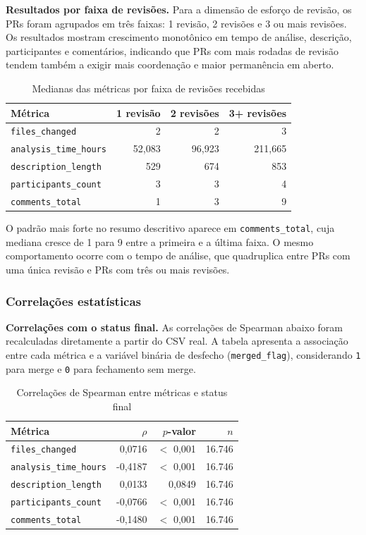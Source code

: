 \documentclass[12pt,a4paper]{article}
\begin{document}
\textbf{Resultados por faixa de revis\~oes.} Para a dimens\~ao de esfor\c{c}o de revis\~ao, os PRs foram agrupados em tr\^es faixas: 1 revis\~ao, 2 revis\~oes e 3 ou mais revis\~oes. Os resultados mostram crescimento monot\^onico em tempo de an\'alise, descri\c{c}\~ao, participantes e coment\'arios, indicando que PRs com mais rodadas de revis\~ao tendem tamb\'em a exigir mais coordena\c{c}\~ao e maior perman\^encia em aberto.

\begin{table}[H]
\centering
\caption{Medianas das m\'etricas por faixa de revis\~oes recebidas}
\begin{tabular}{@{}lrrr@{}}
\toprule
M\'etrica & 1 revis\~ao & 2 revis\~oes & 3+ revis\~oes \\ \midrule
\texttt{files\_changed} & 2 & 2 & 3 \\
\texttt{analysis\_time\_hours} & 52,083 & 96,923 & 211,665 \\
\texttt{description\_length} & 529 & 674 & 853 \\
\texttt{participants\_count} & 3 & 3 & 4 \\
\texttt{comments\_total} & 1 & 3 & 9 \\ \bottomrule
\end{tabular}
\end{table}

O padr\~ao mais forte no resumo descritivo aparece em \texttt{comments\_total}, cuja mediana cresce de 1 para 9 entre a primeira e a \'ultima faixa. O mesmo comportamento ocorre com o tempo de an\'alise, que quadruplica entre PRs com uma \'unica revis\~ao e PRs com tr\^es ou mais revis\~oes.

\subsubsection{Correla\c{c}\~oes estat\'isticas}
\textbf{Correla\c{c}\~oes com o status final.} As correla\c{c}\~oes de Spearman abaixo foram recalculadas diretamente a partir do CSV real. A tabela apresenta a associa\c{c}\~ao entre cada m\'etrica e a vari\'avel bin\'aria de desfecho (\texttt{merged\_flag}), considerando \texttt{1} para merge e \texttt{0} para fechamento sem merge.

\begin{table}[H]
\centering
\caption{Correla\c{c}\~oes de Spearman entre m\'etricas e status final}
\begin{tabular}{@{}lrrr@{}}
\toprule
M\'etrica & $\rho$ & $p$-valor & $n$ \\ \midrule
\texttt{files\_changed} & 0,0716 & $<$ 0,001 & 16.746 \\
\texttt{analysis\_time\_hours} & -0,4187 & $<$ 0,001 & 16.746 \\
\texttt{description\_length} & 0,0133 & 0,0849 & 16.746 \\
\texttt{participants\_count} & -0,0766 & $<$ 0,001 & 16.746 \\
\texttt{comments\_total} & -0,1480 & $<$ 0,001 & 16.746 \\ \bottomrule
\end{tabular}
\end{table}
\end{document}
